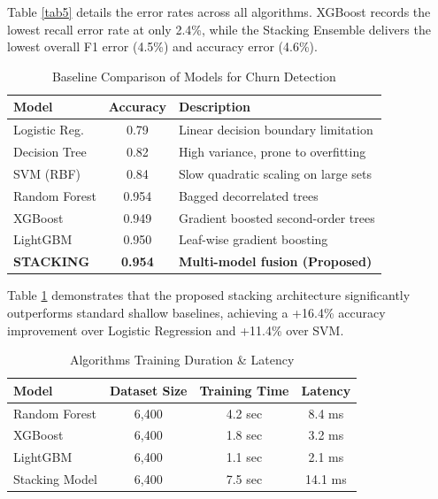 \documentclass[conference]{IEEEtran}
\begin{document}
Table \ref{tab5} details the error rates across all algorithms. XGBoost records the lowest recall error rate at only 2.4\%, while the Stacking Ensemble delivers the lowest overall F1 error (4.5\%) and accuracy error (4.6\%).

\begin{table}[htbp]
\caption{Baseline Comparison of Models for Churn Detection}
\begin{center}
\begin{tabular}{lcl}
\toprule
\textbf{Model} & \textbf{Accuracy} & \textbf{Description} \\
\midrule
Logistic Reg. & 0.79 & Linear decision boundary limitation \\
Decision Tree & 0.82 & High variance, prone to overfitting \\
SVM (RBF) & 0.84 & Slow quadratic scaling on large sets \\
Random Forest & 0.954 & Bagged decorrelated trees \\
XGBoost & 0.949 & Gradient boosted second-order trees \\
LightGBM & 0.950 & Leaf-wise gradient boosting \\
\textbf{STACKING} & \textbf{0.954} & \textbf{Multi-model fusion (Proposed)} \\
\bottomrule
\end{tabular}
\label{tab6}
\end{center}
\end{table}

Table \ref{tab6} demonstrates that the proposed stacking architecture significantly outperforms standard shallow baselines, achieving a +16.4\% accuracy improvement over Logistic Regression and +11.4\% over SVM.

\begin{table}[htbp]
\caption{Algorithms Training Duration \& Latency}
\begin{center}
\begin{tabular}{lccc}
\toprule
\textbf{Model} & \textbf{Dataset Size} & \textbf{Training Time} & \textbf{Latency} \\
\midrule
Random Forest & 6,400 & 4.2 sec & 8.4 ms \\
XGBoost & 6,400 & 1.8 sec & 3.2 ms \\
LightGBM & 6,400 & 1.1 sec & 2.1 ms \\
Stacking Model & 6,400 & 7.5 sec & 14.1 ms \\
\bottomrule
\end{tabular}
\label{tab7}
\end{center}
\end{table}
\end{document}
